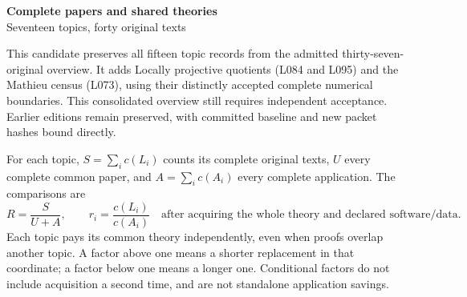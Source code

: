 \documentclass[11pt,a4paper]{article}
\begin{document}
\begin{center}\Large\textbf{Complete papers and shared theories}\\[4pt]
\normalsize Seventeen topics, forty original texts\end{center}
This candidate preserves all fifteen topic records from the admitted thirty-seven-original overview. It adds Locally projective quotients (L084 and L095) and the Mathieu census (L073), using their distinctly accepted complete numerical boundaries. This consolidated overview still requires independent acceptance. Earlier editions remain preserved, with committed baseline and new packet hashes bound directly.

For each topic, $S=\sum_i c(L_i)$ counts its complete original texts, $U$ every complete common paper, and $A=\sum_i c(A_i)$ every complete application. The comparisons are
\[
 R=\frac{S}{U+A},\qquad r_i=\frac{c(L_i)}{c(A_i)}
 \quad\text{after acquiring the whole theory and declared software/data.}
\]
Each topic pays its common theory independently, even when proofs overlap another topic. A factor above one means a shorter replacement in that coordinate; a factor below one means a longer one. Conditional factors do not include acquisition a second time, and are not standalone application savings.
\end{document}
